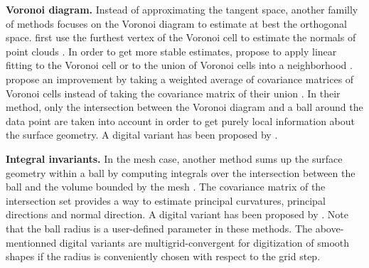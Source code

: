 

\noindent\textbf{Voronoi diagram.}
Instead of approximating the tangent space, another familly of methods focuses on the
Voronoi diagram to estimate at best the orthogonal space. \citeauthor*{Amenta1999} first use the
furthest vertex of the Voronoi cell to estimate the normals of point clouds \cite{Amenta1999}.
In order to get more stable estimates, \citeauthor*{Alliez2007} propose to apply linear fitting
to the Voronoi cell or to the union of Voronoi cells into a neighborhood \cite{Alliez2007}. 
\citeauthor*{Merigot2011} propose an improvement %
by taking a weighted average of covariance matrices of Voronoi cells instead of
taking the covariance matrix of their union \cite{Merigot2011}. In their method,
only the intersection between the Voronoi diagram and a ball around the data point
are taken into account in order to get purely local information about the surface geometry.
A digital variant has been proposed by \citeauthor*{Cuel2015} \cite{Cuel2015}. 

\noindent\textbf{Integral invariants.}
In the mesh case, another method sums up the surface geometry within a ball by 
computing integrals over the intersection between the ball and the volume
bounded by the mesh \cite{Pottmann2009}. The covariance matrix of the intersection set 
provides a way to estimate principal curvatures, principal directions and normal direction.
A digital variant has been proposed by \citeauthor*{Lachaud2017} \cite{Lachaud2017}.
%
Note that the ball radius is a user-defined parameter in these
methods. The above-mentionned digital variants
\cite{Cuel2015,Lachaud2017} are multigrid-convergent for digitization
of smooth shapes if the radius is conveniently chosen with respect to
the grid step. 

